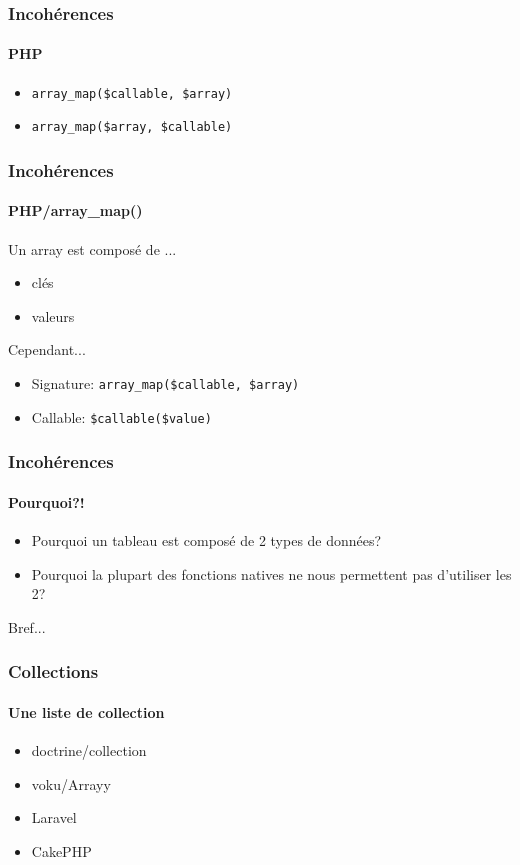 \begin{frame}
	\frametitle{Incohérences}
    \framesubtitle{PHP}

    \begin{itemize}[<+->]
        \item \texttt{array\_map(\$callable, \$array)}
        \item \texttt{array\_map(\$array, \$callable)}
    \end{itemize}
\end{frame}

\begin{frame}
	\frametitle{Incohérences}
    \framesubtitle{PHP/array\_map()}

    Un array est composé de ...

    \begin{itemize}[<+->]
        \item clés
        \item valeurs
    \end{itemize}

    \pause

    Cependant...

    \pause

    \begin{itemize}[<+->]
        \item Signature: \texttt{array\_map(\$callable, \$array)}
        \item Callable: \texttt{\$callable(\$value)}
    \end{itemize}
\end{frame}

\begin{frame}
	\frametitle{Incohérences}
    \framesubtitle{Pourquoi?!}

    \begin{itemize}[<+->]
        \item Pourquoi un tableau est composé de 2 types de données?
        \item Pourquoi la plupart des fonctions natives ne nous permettent pas d'utiliser les 2?
    \end{itemize}
\end{frame}

\begin{frameC}{Bref...}

\end{frameC}

\begin{frame}
	\frametitle{Collections}
    \framesubtitle{Une liste de collection}

    \begin{itemize}[<+->]
        \item doctrine/collection
        \item voku/Arrayy
        \item Laravel
        \item CakePHP
    \end{itemize}
\end{frame}

